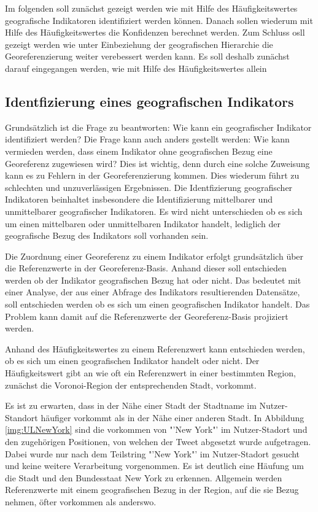 		Im folgenden soll zunächst gezeigt werden wie mit Hilfe des Häufigkeitswertes geografische Indikatoren identifiziert werden können.
		Danach sollen wiederum mit Hilfe des Häufigkeitswertes die Konfidenzen berechnet werden. 
		Zum Schluss osll gezeigt werden wie unter Einbeziehung der geografischen Hierarchie die Georeferenzierung weiter verebessert werden kann.  
		Es soll deshalb zunächst darauf eingegangen werden, wie mit Hilfe des Häufigkeitswertes allein 

		\subsection{Identfizierung eines geografischen Indikators}
			
			Grundsätzlich ist die Frage zu beantworten: Wie kann ein geografischer Indikator identifiziert werden?
			Die Frage kann auch anders gestellt werden: Wie kann vermieden werden, dass einem Indikator ohne geografischen Bezug eine Georeferenz zugewiesen wird?
			Dies ist wichtig, denn durch eine solche Zuweisung kann es zu Fehlern in der Georeferenzierung kommen.
			Dies wiederum führt zu schlechten und unzuverlässigen Ergebnissen.	
			Die Identfizierung geografischer Indikatoren beinhaltet insbesondere die Identifizierung mittelbarer und unmittelbarer geografischer Indikatoren. 
			Es wird nicht unterschieden ob es sich um einen mittelbaren oder unmittelbaren Indikator handelt, lediglich der geografische Bezug des Indikators soll vorhanden sein.

			Die Zuordnung einer Georeferenz zu einem Indikator erfolgt grundsätzlich über die Referenzwerte in der Georeferenz-Basis.
			Anhand dieser soll entschieden werden ob der Indikator geografischen Bezug hat oder nicht.
			Das bedeutet mit einer Analyse, der aus einer Abfrage des Indikators resultierenden Datensätze, soll entschieden werden ob es sich um einen geografischen Indikator handelt.  
			Das Problem kann damit auf die Referenzwerte der Georeferenz-Basis projiziert werden.

			Anhand des Häufigkeitswertes zu einem Referenzwert kann entschieden werden, ob es sich um einen geografischen Indikator handelt oder nicht.
			Der Häufigkeitswert gibt an wie oft ein Referenzwert in einer bestimmten Region, zunächst die Voronoi-Region der entsprechenden Stadt, vorkommt.			 
			
			Es ist zu erwarten, dass in der Nähe einer Stadt der Stadtname im Nutzer-Standort häufiger vorkommt als in der Nähe einer anderen Stadt.
			In Abbildung \ref{img:ULNewYork} sind die vorkommen von "'New York"' im Nutzer-Stadort und den zugehörigen Positionen, von welchen der Tweet abgesetzt wurde aufgetragen.
			Dabei wurde nur nach dem Teilstring "'New York"' im Nutzer-Stadort gesucht und keine weitere Verarbeitung vorgenommen.
			Es ist deutlich eine Häufung um die Stadt und den Bundesstaat New York zu erkennen. 
			Allgemein werden Referenzwerte mit einem geografischen Bezug in der Region, auf die sie Bezug nehmen, öfter vorkommen als anderswo.



